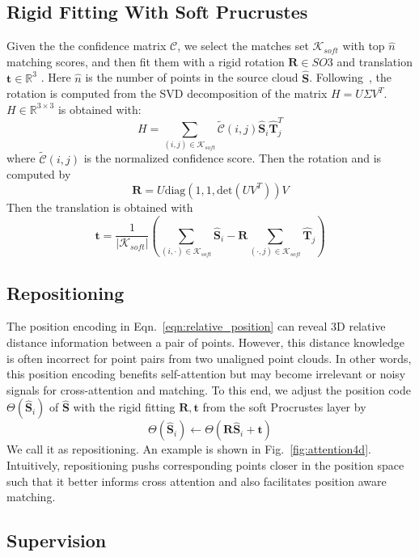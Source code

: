 \subsection{Rigid Fitting With Soft Prucrustes}\label{sec:prucrustes}
Given the the confidence matrix $\mathcal{C}$, we select the matches set $\mathcal{K}_{soft}$ with top $\hat{n}$ matching scores, and then fit them with a rigid rotation $\mathbf{R} \in SO3$ and translation $\mathbf{t}\in \mathbb{R}^3$ .  Here $\hat{n}$ is the number of points in the source cloud $\mathbf{\hat{S}}$.
Following~\cite{arun1987procrustes}, the rotation is computed from the SVD decomposition of the matrix $H = U\Sigma V^T$.  $H\in\mathbb{R}^{3\times3}$ is obtained with:  
$$H=\sum_{(i,j)\in \mathcal{K}_{soft} } \mathcal{\tilde{C}}(i,j) \mathbf{\hat{S}}_i \mathbf{\hat{T}}_j^T $$
where $\mathcal{\tilde{C}}(i,j)$ is the normalized confidence score. Then the rotation and is computed by
$$\mathbf{R}=U\text{diag}(1,1,\text{det}(UV^T))V $$ 
Then the translation is obtained with 
$$
\mathbf{t} = 
\frac{1}{|\mathcal{K}_{soft}|} 
(\sum_{(i,\cdot)\in \mathcal{K}_{soft}}\mathbf{\hat{S}}_i 
- \mathbf{R}
\sum_{(\cdot,j)\in \mathcal{K}_{soft}}
\mathbf{\hat{T}}_j) 
$$


\subsection{Repositioning}\label{sec:Repositioning}
The position encoding in Eqn.~\ref{eqn:relative_position} can reveal 3D relative distance information between a pair of points.
However, this distance knowledge is often incorrect for point pairs from two unaligned point clouds.
In other words, this position encoding benefits self-attention but may become irrelevant or noisy signals for cross-attention and matching.
To this end, we adjust the position code $\Theta(\mathbf{\hat{S}}_i)$ of $\mathbf{\hat{S}}$ with the rigid fitting $\mathbf{R},\mathbf{t}$ from the soft Procrustes layer by
$$
\Theta(\mathbf{\hat{S}}_i) \gets  \Theta( \mathbf{R}\mathbf{\hat{S}}_i + \mathbf{t})
$$We call it as repositioning. An example is shown in Fig.~\ref{fig:attention4d}.
Intuitively, repositioning pushs corresponding points closer in the position space such that it better informs cross attention and also facilitates position aware matching.

\subsection{Supervision}\label{sec:Supervision}


